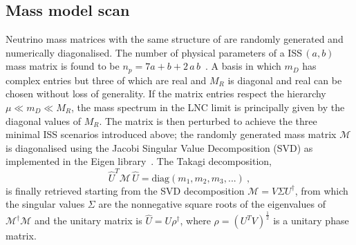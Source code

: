 \subsection{Mass model scan}

Neutrino mass matrices with the same structure of  are randomly generated and numerically diagonalised.
The number of physical parameters of a ISS\,$(a,b)$ mass matrix is found to be $n_p = 7a + b +2\, a\,b$~\cite{Abada:2014vea}. %
A basis in which $m_D$ has complex entries but three of which are real %
and $M_R$ is diagonal and real can be chosen without loss of generality.
If the matrix entries respect the hierarchy \mbox{$\mu \ll m_D \ll M_R$}, the mass spectrum in %
the LNC limit is principally given by the diagonal values of $M_R$.
The matrix is then perturbed to achieve the three minimal ISS scenarios introduced above; %
the randomly generated mass matrix $\mathcal{M}$ %
is diagonalised using the Jacobi Singular Value Decomposition (SVD) as implemented in the Eigen library~\cite{eigenweb}.
The Takagi decomposition, %
\begin{equation}
	\hat{U}^T \mathcal{M}\, \hat{U} = \text{diag}(m_1, m_2, m_3, ...)\ ,
\end{equation}
is finally retrieved starting from the SVD decomposition $\mathcal{M} = V \Sigma U^\dagger$, %
from which the singular values $\Sigma$ are the nonnegative square roots of the eigenvalues of $\mathcal{M}^\dagger \mathcal{M}$ %
and the unitary matrix is $\hat{U} = U \rho^\dagger$, where $\rho = (U^T V)^\frac{1}{2}$ is a unitary phase matrix.

